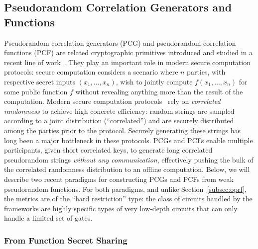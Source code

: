 \subsection{Pseudorandom Correlation Generators and Functions}

Pseudorandom correlation generators (PCG) and pseudorandom correlation functions (PCF) are related cryptographic primitives introduced and studied in a recent line of work~\cite{CCS:BCGI18,C:BCGIKS19,CCS:BCGIKR19,C:BCGIKS20,FOCS:BCGIKS20,C:CouRinRag21,C:BCGIKR22,C:BCCD23}. They play an important role in modern secure computation protocols: secure computation considers a scenario where $n$ parties, with respective secret inputs $(x_1, \ldots, x_n)$, wish to jointly compute $f(x_1,\ldots,x_n)$ for some public function $f$ without revealing anything more than the result of the computation. Modern secure computation protocols~\cite{STOC:GolMicWig87,AC:FKOS15,CCS:KelOrsSch16,C:DPSZ12,EC:KelPasRot18} rely on \emph{correlated randomness} to achieve high concrete efficiency: random strings are sampled according to a joint distribution (``correlated'') and are securely distributed among the parties prior to the protocol. Securely generating these strings has long been a major bottleneck in these protocols. PCGs and PCFs enable multiple participants, given short correlated keys, to generate long correlated pseudorandom strings \emph{without any communication}, effectively pushing the bulk of the correlated randomness distribution to an offline computation. Below, we will describe two recent paradigms for constructing PCGs and PCFs from weak pseudorandom functions. For both paradigms, and unlike Section~\ref{subsec:oprf}, the metrics are of the ``hard restriction'' type: the class of circuits handled by the frameworks are highly specific types of very low-depth circuits that can only handle a limited set of gates.


\subsubsection{From Function Secret Sharing}
\label{subsubsec:fss}

